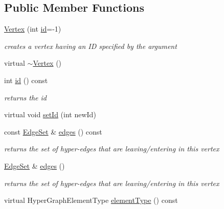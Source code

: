 \subsection*{Public Member Functions}
\begin{DoxyCompactItemize}
\item 
\mbox{\hyperlink{classg2o_1_1_hyper_graph_1_1_vertex_a7f2e986815608e5ac4a44671ed9794ae}{Vertex}} (int \mbox{\hyperlink{classg2o_1_1_hyper_graph_1_1_vertex_a48191960395856d1b686287489e53da3}{id}}=-\/1)
\begin{DoxyCompactList}\small\item\em creates a vertex having an ID specified by the argument \end{DoxyCompactList}\item 
virtual \mbox{\hyperlink{classg2o_1_1_hyper_graph_1_1_vertex_a4c3da5bcc97c960c43bc49cc2ade649c}{$\sim$\+Vertex}} ()
\item 
int \mbox{\hyperlink{classg2o_1_1_hyper_graph_1_1_vertex_a48191960395856d1b686287489e53da3}{id}} () const
\begin{DoxyCompactList}\small\item\em returns the id \end{DoxyCompactList}\item 
virtual void \mbox{\hyperlink{classg2o_1_1_hyper_graph_1_1_vertex_ac861d25447d8ff167d23c45458f7382f}{set\+Id}} (int new\+Id)
\item 
const \mbox{\hyperlink{classg2o_1_1_hyper_graph_a5e2970e236c0dcb4eff7c205d7b6b4ae}{Edge\+Set}} \& \mbox{\hyperlink{classg2o_1_1_hyper_graph_1_1_vertex_a3794ff3310c1dc05619bf0b77eaa4caa}{edges}} () const
\begin{DoxyCompactList}\small\item\em returns the set of hyper-\/edges that are leaving/entering in this vertex \end{DoxyCompactList}\item 
\mbox{\hyperlink{classg2o_1_1_hyper_graph_a5e2970e236c0dcb4eff7c205d7b6b4ae}{Edge\+Set}} \& \mbox{\hyperlink{classg2o_1_1_hyper_graph_1_1_vertex_a35cbf4ea796797bb5d9c35a41454e8fb}{edges}} ()
\begin{DoxyCompactList}\small\item\em returns the set of hyper-\/edges that are leaving/entering in this vertex \end{DoxyCompactList}\item 
virtual Hyper\+Graph\+Element\+Type \mbox{\hyperlink{classg2o_1_1_hyper_graph_1_1_vertex_a8f214b9065b88a3aafff7442380476ab}{element\+Type}} () const
\end{DoxyCompactItemize}
